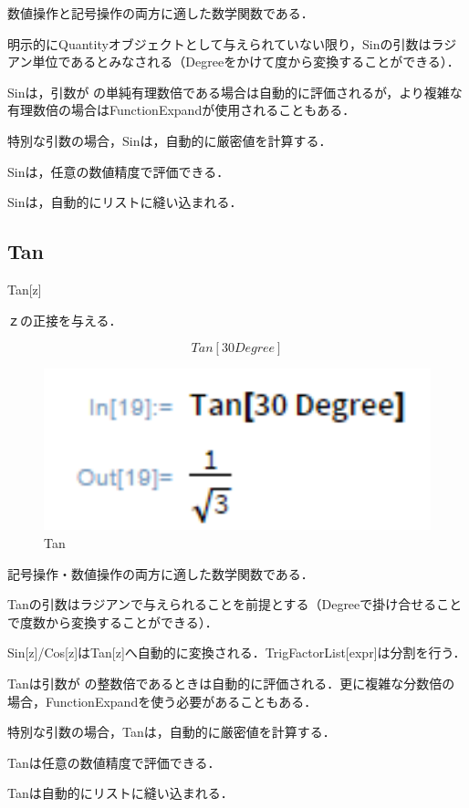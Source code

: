 数値操作と記号操作の両方に適した数学関数である．

明示的にQuantityオブジェクトとして与えられていない限り，Sinの引数はラジアン単位であるとみなされる（Degreeをかけて度から変換することができる）． 

Sinは，引数が  の単純有理数倍である場合は自動的に評価されるが，より複雑な有理数倍の場合はFunctionExpandが使用されることもある． 

特別な引数の場合，Sinは，自動的に厳密値を計算する．

Sinは，任意の数値精度で評価できる．

Sinは，自動的にリストに縫い込まれる．

\clearpage

\subsection {Tan}

Tan[z]

ｚの正接を与える．

\[Tan[30 Degree]\]

\begin{figure}[h]
\centering
\includegraphics[width=15cm]{tan.png}
\caption{Tan}\label{図}
\end{figure}

記号操作・数値操作の両方に適した数学関数である．

Tanの引数はラジアンで与えられることを前提とする（Degreeで掛け合せることで度数から変換することができる）．

Sin[z]/Cos[z]はTan[z]へ自動的に変換される．TrigFactorList[expr]は分割を行う．

Tanは引数が  の整数倍であるときは自動的に評価される．更に複雑な分数倍の場合，FunctionExpandを使う必要があることもある．

特別な引数の場合，Tanは，自動的に厳密値を計算する．

Tanは任意の数値精度で評価できる．

Tanは自動的にリストに縫い込まれる．


